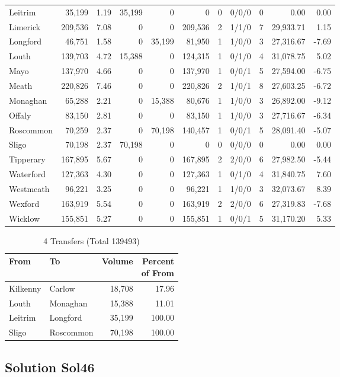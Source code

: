 \documentclass[a4paper]{article}
\begin{document}
\begin{longtable}{lrrrrrrlrrr}
Leitrim&35,199& 1.19&35,199&0&0&0&0/0/0&0& 0.00& 0.00\\ 
Limerick&209,536& 7.08&0&0&209,536&2&1/1/0&7&29,933.71& 1.15\\ 
Longford&46,751& 1.58&0&35,199&81,950&1&1/0/0&3&27,316.67&-7.69\\ 
Louth&139,703& 4.72&15,388&0&124,315&1&0/1/0&4&31,078.75& 5.02\\ 
Mayo&137,970& 4.66&0&0&137,970&1&0/0/1&5&27,594.00&-6.75\\ 
Meath&220,826& 7.46&0&0&220,826&2&1/0/1&8&27,603.25&-6.72\\ 
Monaghan&65,288& 2.21&0&15,388&80,676&1&1/0/0&3&26,892.00&-9.12\\ 
Offaly&83,150& 2.81&0&0&83,150&1&1/0/0&3&27,716.67&-6.34\\ 
Roscommon&70,259& 2.37&0&70,198&140,457&1&0/0/1&5&28,091.40&-5.07\\ 
Sligo&70,198& 2.37&70,198&0&0&0&0/0/0&0& 0.00& 0.00\\ 
Tipperary&167,895& 5.67&0&0&167,895&2&2/0/0&6&27,982.50&-5.44\\ 
Waterford&127,363& 4.30&0&0&127,363&1&0/1/0&4&31,840.75& 7.60\\ 
Westmeath&96,221& 3.25&0&0&96,221&1&1/0/0&3&32,073.67& 8.39\\ 
Wexford&163,919& 5.54&0&0&163,919&2&2/0/0&6&27,319.83&-7.68\\ 
Wicklow&155,851& 5.27&0&0&155,851&1&0/0/1&5&31,170.20& 5.33\\ 
\end{longtable}

\begin{table}[htbp]
\caption{4 Transfers (Total 139493)}
\centering
\begin{tabular}{llrr} \toprule
From &To &Volume &\shortstack{Percent\\of From} \\ \midrule
Kilkenny&Carlow&18,708&17.96\\ 
Louth&Monaghan&15,388&11.01\\ 
Leitrim&Longford&35,199&100.00\\ 
Sligo&Roscommon&70,198&100.00\\ 
\bottomrule
\end{tabular}
\end{table}

\clearpage
\subsection{Solution Sol46}
\end{document}
